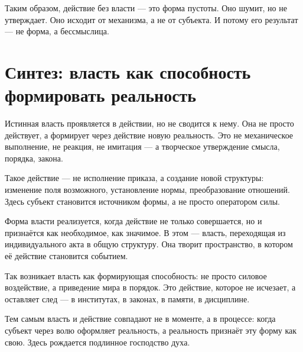 Таким образом, действие без власти — это форма пустоты. Оно шумит, но не утверждает. Оно исходит от механизма, а не от субъекта. И потому его результат — не форма, а бессмыслица.

\section{Синтез: власть как способность формировать реальность}

Истинная власть проявляется в действии, но не сводится к нему. Она не просто действует, а формирует через действие новую реальность. Это не механическое выполнение, не реакция, не имитация — а творческое утверждение смысла, порядка, закона.

Такое действие — не исполнение приказа, а создание новой структуры: изменение поля возможного, установление нормы, преобразование отношений. Здесь субъект становится источником формы, а не просто оператором силы.

Форма власти реализуется, когда действие не только совершается, но и признаётся как необходимое, как значимое. В этом — власть, переходящая из индивидуального акта в общую структуру. Она творит пространство, в котором её действие становится событием.

Так возникает власть как формирующая способность: не просто силовое воздействие, а приведение мира в порядок. Это действие, которое не исчезает, а оставляет след — в институтах, в законах, в памяти, в дисциплине.

Тем самым власть и действие совпадают не в моменте, а в процессе: когда субъект через волю оформляет реальность, а реальность признаёт эту форму как свою. Здесь рождается подлинное господство духа.
